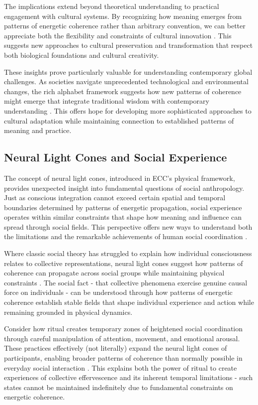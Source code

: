 The implications extend beyond theoretical understanding to practical engagement with cultural systems. By recognizing how meaning emerges from patterns of energetic coherence rather than arbitrary convention, we can better appreciate both the flexibility and constraints of cultural innovation \cite{rappaport1999ritual}. This suggests new approaches to cultural preservation and transformation that respect both biological foundations and cultural creativity.

These insights prove particularly valuable for understanding contemporary global challenges. As societies navigate unprecedented technological and environmental changes, the rich alphabet framework suggests how new patterns of coherence might emerge that integrate traditional wisdom with contemporary understanding \cite{bateson1972steps}. This offers hope for developing more sophisticated approaches to cultural adaptation while maintaining connection to established patterns of meaning and practice.

\subsection{Neural Light Cones and Social Experience}

The concept of neural light cones, introduced in ECC's physical framework, provides unexpected insight into fundamental questions of social anthropology. Just as conscious integration cannot exceed certain spatial and temporal boundaries determined by patterns of energetic propagation, social experience operates within similar constraints that shape how meaning and influence can spread through social fields. This perspective offers new ways to understand both the limitations and the remarkable achievements of human social coordination \cite{durkheim1995elementary}.

Where classic social theory has struggled to explain how individual consciousness relates to collective representations, neural light cones suggest how patterns of coherence can propagate across social groups while maintaining physical constraints \cite{schutz1967phenomenology}. The social fact - that collective phenomena exercise genuine causal force on individuals - can be understood through how patterns of energetic coherence establish stable fields that shape individual experience and action while remaining grounded in physical dynamics.

Consider how ritual creates temporary zones of heightened social coordination through careful manipulation of attention, movement, and emotional arousal. These practices effectively (not literally) expand the neural light cones of participants, enabling broader patterns of coherence than normally possible in everyday social interaction \cite{turner1969ritual}. This explains both the power of ritual to create experiences of collective effervescence and its inherent temporal limitations - such states cannot be maintained indefinitely due to fundamental constraints on energetic coherence.

